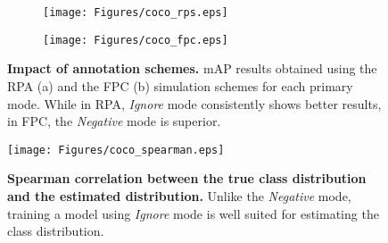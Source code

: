 \begin{figure}[t!]
\begin{subfigure}[a]{.23\textwidth}
  \centering
  \texttt{[image: Figures/coco\_rps.eps]}
  \caption{}
\end{subfigure}\begin{subfigure}[h]{.23\textwidth }
  \centering
  \texttt{[image: Figures/coco\_fpc.eps]}
  \caption{}
\end{subfigure}
\caption{\textbf{Impact of annotation schemes.} mAP results obtained using the RPA (a) and the FPC (b) simulation schemes for each primary mode. While in RPA, \textit{Ignore} mode consistently shows better results, in FPC, the \textit{Negative} mode is superior.}
\label{fig:impact_modes}
\vspace{-3mm}
\end{figure}

\begin{figure} [t!]
  \vspace{-0.2cm}
  \centering
  \texttt{[image: Figures/coco\_spearman.eps]}
  \vspace{-0.1cm}
\caption{\textbf{Spearman correlation between the true class distribution and the estimated distribution.} 
  Unlike the \textit{Negative} mode, training a model using \textit{Ignore} mode is well suited for estimating the class distribution.}
  \label{fig:coco_spearman}
  \vspace{-0.1cm}
\end{figure}


